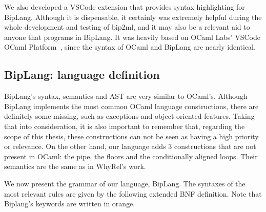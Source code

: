 We also developed a VSCode extension that provides syntax highlighting for BipLang.
Although it is dispensable, it certainly was extremely helpful during the whole development and testing of bip2ml, and it may also be a relevant aid to anyone that programs in BipLang.
It was heavily based on OCaml Labs' VSCode OCaml Platform~\cite{ocaml-platform}, since the syntax of OCaml and BipLang are nearly identical.


\FloatBarrier
\subsection{BipLang: language definition}
\label{subsec:lang_def}

BipLang's syntax, semantics and AST are very similar to OCaml's.
Although BipLang implements the most common OCaml language constructions, there are definitely some missing, such as exceptions and object-oriented features.
Taking that into consideration, it is also important to remember that, regarding the scope of this thesis, these constructions can not be seen as having a high priority or relevance.
On the other hand, our language adds 3 constructions that are not present in OCaml: the pipe, the floors and the conditionally aligned loops.
Their semantics are the same as in WhyRel's work.

We now present the grammar of our language, BipLang.
The syntaxes of the most relevant rules are given by the following extended BNF definition.
Note that Biplang's keywords are written in orange.

